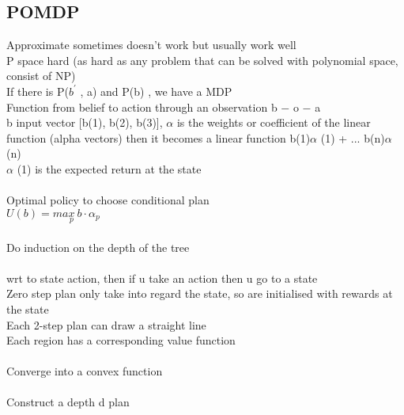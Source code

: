 \documentclass[11pt]{article}
\begin{document}
\subsection*{POMDP}
Approximate sometimes doesn't work but usually work well\\
P space hard (as hard as any problem that can be solved with polynomial space, consist of NP)\\
If there is P(\(b^{\prime}\) , a) and P(b) , we have a MDP\\
Function from belief to action through an observation b $-$ o $-$ a
\\
b input vector [b(1), b(2), b(3)], $\alpha$ is the weights or coefficient of the linear function (alpha vectors) then it becomes a linear function b(1)$\alpha$ (1) + ... b(n)$\alpha$ (n) \\
$\alpha$ (1) is the expected return at the state\\
\\
Optimal policy to choose conditional plan\\
$U(b) = max\limits_{p}\ b \cdot \alpha_{p}$\\
\\
Do induction on the depth of the tree\\
\\
wrt to state action, then if u take an action then u go to a state\\
Zero step plan only take into regard the state, so are initialised with rewards at the state\\
Each 2-step plan can draw a straight line\\
Each region has a corresponding value function\\
\\
Converge into a convex function\\
\\
Construct a depth d plan\\
\end{document}
